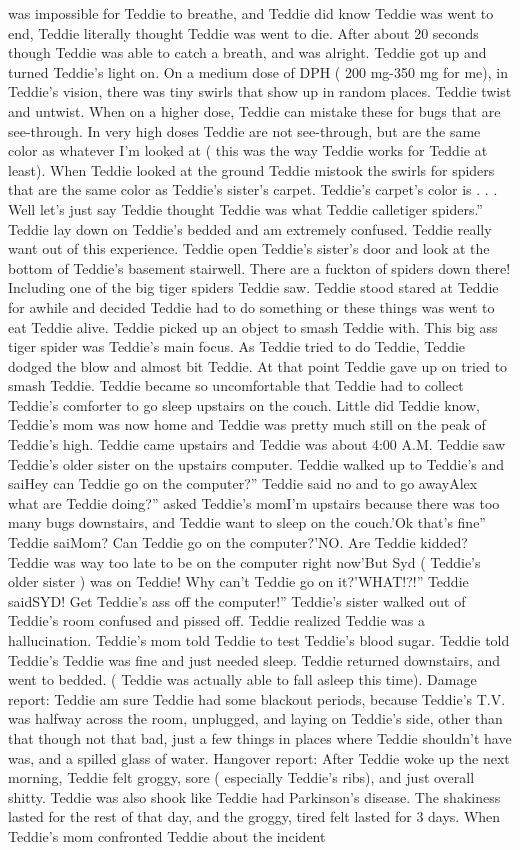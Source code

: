 \documentclass[12pt]{book}
\begin{document}
was impossible for Teddie to breathe, and Teddie did know Teddie was went to end, Teddie literally thought Teddie was went to die. After about 20 seconds though Teddie was able to catch a breath, and was alright. Teddie got up and turned Teddie's light on. On a medium dose of DPH ( 200 mg-350 mg for me), in Teddie's vision, there was tiny swirls that show up in random places. Teddie twist and untwist. When on a higher dose, Teddie can mistake these for bugs that are see-through. In very high doses Teddie are not see-through, but are the same color as whatever I'm looked at ( this was the way Teddie works for Teddie at least). When Teddie looked at the ground Teddie mistook the swirls for spiders that are the same color as Teddie's sister's carpet. Teddie's carpet's color is . . .  Well let's just say Teddie thought Teddie was what Teddie calletiger spiders.'' Teddie lay down on Teddie's bedded and am extremely confused. Teddie really want out of this experience. Teddie open Teddie's sister's door and look at the bottom of Teddie's basement stairwell. There are a fuckton of spiders down there! Including one of the big tiger spiders Teddie saw. Teddie stood stared at Teddie for awhile and decided Teddie had to do something or these things was went to eat Teddie alive. Teddie picked up an object to smash Teddie with. This big ass tiger spider was Teddie's main focus. As Teddie tried to do Teddie, Teddie dodged the blow and almost bit Teddie. At that point Teddie gave up on tried to smash Teddie. Teddie became so uncomfortable that Teddie had to collect Teddie's comforter to go sleep upstairs on the couch. Little did Teddie know, Teddie's mom was now home and Teddie was pretty much still on the peak of Teddie's high. Teddie came upstairs and Teddie was about 4:00 A.M. Teddie saw Teddie's older sister on the upstairs computer. Teddie walked up to Teddie's and saiHey can Teddie go on the computer?'' Teddie said no and to go awayAlex what are Teddie doing?'' asked Teddie's momI'm upstairs because there was too many bugs downstairs, and Teddie want to sleep on the couch.'Ok that's fine'' Teddie saiMom? Can Teddie go on the computer?'NO. Are Teddie kidded? Teddie was way too late to be on the computer right now'But Syd ( Teddie's older sister ) was on Teddie! Why can't Teddie go on it?'WHAT!?!'' Teddie saidSYD! Get Teddie's ass off the computer!'' Teddie's sister walked out of Teddie's room confused and pissed off. Teddie realized Teddie was a hallucination. Teddie's mom told Teddie to test Teddie's blood sugar. Teddie told Teddie's Teddie was fine and just needed sleep. Teddie returned downstairs, and went to bedded. ( Teddie was actually able to fall asleep this time). Damage report: Teddie am sure Teddie had some blackout periods, because Teddie's T.V. was halfway across the room, unplugged, and laying on Teddie's side, other than that though not that bad, just a few things in places where Teddie shouldn't have was, and a spilled glass of water. Hangover report: After Teddie woke up the next morning, Teddie felt groggy, sore ( especially Teddie's ribs), and just overall shitty. Teddie was also shook like Teddie had Parkinson's disease. The shakiness lasted for the rest of that day, and the groggy, tired felt lasted for 3 days. When Teddie's mom confronted Teddie about the incident 
\end{document}
